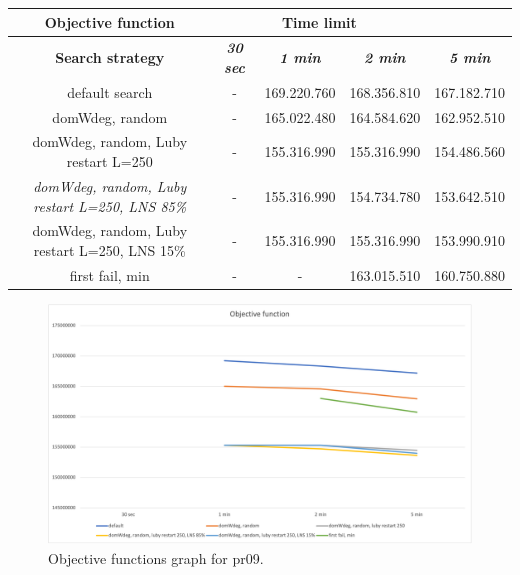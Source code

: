 {
\renewcommand{\arraystretch}{2}
\begin{longtable}[h]{| c | c | c | c | c |}
    \hline
    \textbf{Objective function} & \multicolumn{3}{c}{Time limit} & \\
    \hline
    \textbf{Search strategy} & \textbf{\textit{30 sec}} & \textbf{\textit{1 min}} & \textbf{\textit{2 min}} & \textbf{\textit{5 min}} \\
    \hline
    \endhead
    default search                                         & - & 169.220.760 & 168.356.810 & 167.182.710 \\
    \hline
    domWdeg, random                                        & - & 165.022.480 & 164.584.620 & 162.952.510 \\
    \hline
    domWdeg, random, Luby restart L=250                    & - & 155.316.990 & 155.316.990 & 154.486.560 \\
    \hline
    \textit{domWdeg, random, Luby restart L=250, LNS 85\%} & - & 155.316.990 & 154.734.780 & 153.642.510 \\
    \hline
    domWdeg, random, Luby restart L=250, LNS 15\%          & - & 155.316.990 & 155.316.990 & 153.990.910 \\
    \hline
    first fail, min                                        & - &         - & 163.015.510 & 160.750.880 \\
    \hline
\end{longtable}
}
\begin{figure}[H]
    \centering
    \includegraphics[width=1.0\columnwidth]{../graphs/pr09-objf.png}
    \caption{Objective functions graph for pr09.}
\end{figure}

